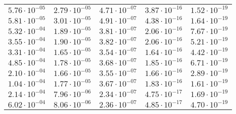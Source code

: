 \begin{table}
\begin{tabular}{lllll}
$\mathrm{5.76 \cdot 10^{-05}}$ & $\mathrm{2.79 \cdot 10^{-05}}$ & $\mathrm{4.71 \cdot 10^{-07}}$ & $\mathrm{3.87 \cdot 10^{-16}}$ & $\mathrm{1.52 \cdot 10^{-19}}$ \\
$\mathrm{5.81 \cdot 10^{-05}}$ & $\mathrm{3.01 \cdot 10^{-05}}$ & $\mathrm{4.91 \cdot 10^{-07}}$ & $\mathrm{4.38 \cdot 10^{-16}}$ & $\mathrm{1.64 \cdot 10^{-19}}$ \\
$\mathrm{5.32 \cdot 10^{-04}}$ & $\mathrm{1.89 \cdot 10^{-05}}$ & $\mathrm{3.81 \cdot 10^{-07}}$ & $\mathrm{2.06 \cdot 10^{-16}}$ & $\mathrm{7.67 \cdot 10^{-19}}$ \\
$\mathrm{3.55 \cdot 10^{-04}}$ & $\mathrm{1.90 \cdot 10^{-05}}$ & $\mathrm{3.82 \cdot 10^{-07}}$ & $\mathrm{2.06 \cdot 10^{-16}}$ & $\mathrm{5.21 \cdot 10^{-19}}$ \\
$\mathrm{3.31 \cdot 10^{-04}}$ & $\mathrm{1.65 \cdot 10^{-05}}$ & $\mathrm{3.54 \cdot 10^{-07}}$ & $\mathrm{1.64 \cdot 10^{-16}}$ & $\mathrm{4.42 \cdot 10^{-19}}$ \\
$\mathrm{4.85 \cdot 10^{-04}}$ & $\mathrm{1.78 \cdot 10^{-05}}$ & $\mathrm{3.68 \cdot 10^{-07}}$ & $\mathrm{1.85 \cdot 10^{-16}}$ & $\mathrm{6.71 \cdot 10^{-19}}$ \\
$\mathrm{2.10 \cdot 10^{-04}}$ & $\mathrm{1.66 \cdot 10^{-05}}$ & $\mathrm{3.55 \cdot 10^{-07}}$ & $\mathrm{1.66 \cdot 10^{-16}}$ & $\mathrm{2.89 \cdot 10^{-19}}$ \\
$\mathrm{1.04 \cdot 10^{-04}}$ & $\mathrm{1.77 \cdot 10^{-05}}$ & $\mathrm{3.67 \cdot 10^{-07}}$ & $\mathrm{1.83 \cdot 10^{-16}}$ & $\mathrm{1.61 \cdot 10^{-19}}$ \\
$\mathrm{2.14 \cdot 10^{-04}}$ & $\mathrm{7.96 \cdot 10^{-06}}$ & $\mathrm{2.34 \cdot 10^{-07}}$ & $\mathrm{4.75 \cdot 10^{-17}}$ & $\mathrm{1.69 \cdot 10^{-19}}$ \\
$\mathrm{6.02 \cdot 10^{-04}}$ & $\mathrm{8.06 \cdot 10^{-06}}$ & $\mathrm{2.36 \cdot 10^{-07}}$ & $\mathrm{4.85 \cdot 10^{-17}}$ & $\mathrm{4.70 \cdot 10^{-19}}$ \\
\bottomrule
\end{tabular}
\end{table}
